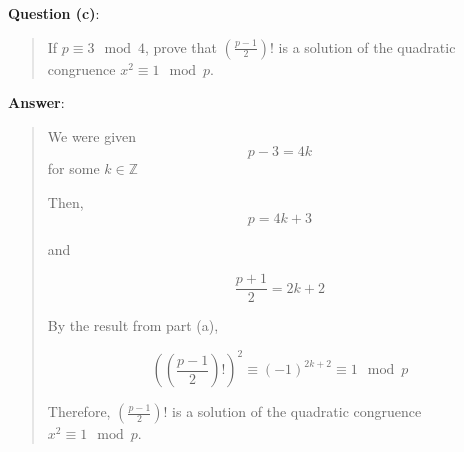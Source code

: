 \documentclass{article} %
\begin{document}
\bigskip
\noindent
\textbf{Question (c)}:
\begin{quote}
    If $p \equiv 3 \mod 4$, prove that $\left(\frac{p-1}{2}\right)!$ is a solution of the quadratic congruence $x^2 \equiv 1 \mod p$.
\end{quote}

\bigskip
\noindent
\textbf{Answer}:
\begin{quote}
    We were given
    \[p - 3 = 4k\]
    for some $k \in \mathbb{Z}$

    Then,
    \[p = 4k + 3\]

    and

    \[\frac{p + 1}{2} = 2k + 2\]

    By the result from part (a),

    \[\left(\left(\frac{p - 1}{2}\right)!\right)^2 \equiv (-1)^{2k + 2} \equiv 1 \mod p\]

    Therefore, $\left(\frac{p-1}{2}\right)!$ is a solution of the quadratic congruence $x^2 \equiv 1 \mod p$.
\end{quote}
\end{document}
